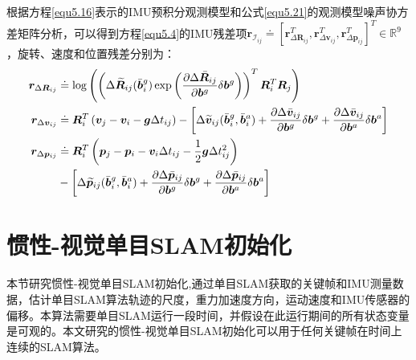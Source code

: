 根据方程\eqref{equ5.16}表示的IMU预积分观测模型和公式\eqref{equ5.21}的观测模型噪声协方差矩阵分析，可以得到方程\eqref{equ5.4}的IMU残差项$\boldsymbol{r}_{\mathcal{I}_{ij}} \doteq \left[ \boldsymbol{r}_{\Delta \boldsymbol{R}_{ij}}^T,\boldsymbol{r}_{\Delta \boldsymbol{v}_{ij}}^T, \boldsymbol{r}_{\Delta \boldsymbol{p}_{ij}}^T \right]^T \in \mathds{R}^9 $，旋转、速度和位置残差分别为：
\begin{equation}
\label{equ5.27}
\begin{aligned}
\boldsymbol{r}_{\Delta \boldsymbol{R}_{ij}} & \doteq \log \left( \left( \Delta \widetilde{\boldsymbol{R}}_{ij}(\bar{\boldsymbol{b}}_i^g) \exp \left( { \partial \Delta \bar{\boldsymbol{R}}_{ij} \over \partial \boldsymbol{b}^g } \delta \boldsymbol{b}^g \right) \right)^T \boldsymbol{R}_i^T \boldsymbol{R}_j  \right) 
\\
\boldsymbol{r}_{\Delta \boldsymbol{v}_{ij}} & \doteq \boldsymbol{R}_i^T \left(\boldsymbol{v}_j-\boldsymbol{v}_i-\boldsymbol{g}\Delta t_{ij} \right) - \left[ \Delta \widetilde{\boldsymbol{v}}_{ij}(\bar{\boldsymbol{b}}_i^g,\bar{\boldsymbol{b}}_i^a) + { \partial \Delta \bar{\boldsymbol{v}}_{ij} \over \partial \boldsymbol{b}^g } \delta \boldsymbol{b}^g + { \partial \Delta \bar{\boldsymbol{v}}_{ij} \over \partial \boldsymbol{b}^a } \delta \boldsymbol{b}^a  \right] 
\\
\boldsymbol{r}_{\Delta \boldsymbol{p}_{ij}} & \doteq \boldsymbol{R}_i^T \left( \boldsymbol{p}_j-\boldsymbol{p}_i-\boldsymbol{v}_i \Delta t_{ij} -{1 \over 2} \boldsymbol{g} \Delta t_{ij}^2 \right) \\
& - \left[ \Delta \widetilde{\boldsymbol{p}}_{ij}(\bar{\boldsymbol{b}}_i^g,\bar{\boldsymbol{b}}_i^a) + { \partial \Delta \bar{\boldsymbol{p}}_{ij} \over \partial \boldsymbol{b}^g } \delta \boldsymbol{b}^g + { \partial \Delta \bar{\boldsymbol{p}}_{ij} \over \partial \boldsymbol{b}^a } \delta \boldsymbol{b}^a  \right]
\end{aligned}
\end{equation}


\section{惯性-视觉单目SLAM初始化}
本节研究惯性-视觉单目SLAM初始化,通过单目SLAM获取的关键帧和IMU测量数据\upcite{[5.3]}，估计单目SLAM算法轨迹的尺度，重力加速度方向，运动速度和IMU传感器的偏移。本算法需要单目SLAM运行一段时间，并假设在此运行期间的所有状态变量是可观的。本文研究的惯性-视觉单目SLAM初始化可以用于任何关键帧在时间上连续的SLAM算法。

